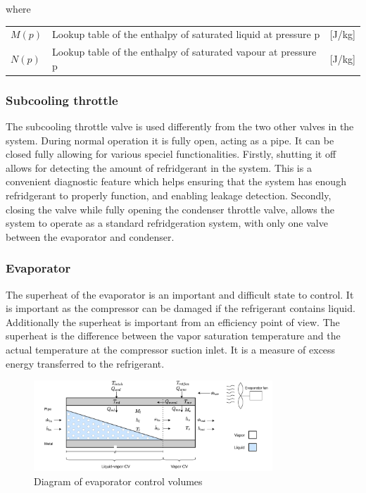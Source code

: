 where

\begin{center}
	\begin{tabular}{l p{8cm} l}
		$M(p)$			&  Lookup table of the enthalpy of saturated liquid	at pressure p		& [\si{J}/\si{kg}]\\
		$N(p)$			&  Lookup table of the enthalpy of saturated vapour	at pressure p		& [\si{J}/\si{kg}] \\

	\end{tabular}
\end{center}

\subsubsection{Subcooling throttle}
The subcooling throttle valve is used differently from the two other valves in the system. During normal operation it is fully open, acting as a pipe. It can be closed fully allowing for various speciel functionalities. Firstly, shutting it off allows for detecting the amount of refridgerant in the system. This is a convenient diagnostic feature which helps ensuring that the system has enough refridgerant to properly function, and enabling leakage detection. Secondly, closing the valve while fully opening the condenser throttle valve, allows the system to operate as a standard refridgeration system, with only one valve between the evaporator and condenser.


\subsubsection{Evaporator}
The superheat of the evaporator is an important and difficult state to control. It is important as the compressor can be damaged if the refrigerant contains liquid. Additionally the superheat is important from an efficiency point of view.
The superheat is the difference between the vapor saturation temperature and the actual temperature at the compressor suction inlet. It is a measure of excess energy transferred to the refrigerant.

\clearpage

\begin{figure}[h!]
	\centering
	\includegraphics[width=0.8\textwidth]{Graphics/Evaporator_CV_diagram.pdf}
	\caption{Diagram of evaporator control volumes}
	\label{fig:evapo_CV}
\end{figure}

